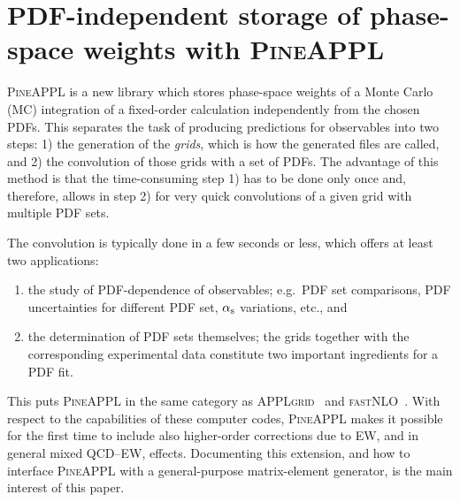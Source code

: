 \section{PDF-independent storage of phase-space weights with \texorpdfstring{\textsc{PineAPPL}}{PineAPPL}}
\label{sec:pineappl}

\textsc{PineAPPL} is a new library which stores phase-space weights of a Monte Carlo (MC) integration of a fixed-order calculation independently from the chosen PDFs.
This separates the task of producing predictions for observables into two steps: 1) the generation of the \emph{grids}, which is how the generated files are called, and 2) the convolution of those grids with a set of PDFs.
The advantage of this method is that the time-consuming step 1) has to be done only once and, therefore, allows in step 2) for very quick convolutions of a given grid with multiple PDF sets.

The convolution is typically done in a few seconds or less, which offers at least two applications:
\begin{enumerate}
\item the study of PDF-dependence of observables; e.g.\ PDF set comparisons, PDF uncertainties for different PDF set, $\alpha_\mathrm{s}$ variations, etc., and
\item the determination of PDF sets themselves; the grids together with the corresponding experimental data constitute two important ingredients for a PDF fit.
\end{enumerate}
This puts \textsc{PineAPPL} in the same category as \textsc{APPLgrid}~\cite{Carli:2010rw} and \textsc{fastNLO}~\cite{Kluge:2006xs,Wobisch:2011ij,Britzger:2012bs}.
With respect to the capabilities of these computer codes, \textsc{PineAPPL} makes it possible for the first time to include also higher-order corrections due to EW, and in general mixed QCD--EW, effects.
Documenting this extension, and how to interface \textsc{PineAPPL} with a general-purpose matrix-element generator, is the main interest of this paper.

